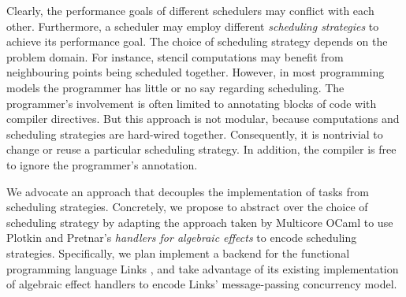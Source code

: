 \documentclass[preprint,10pt,numbers]{sigplanconf}
\begin{document}
Clearly, the performance goals of different schedulers may conflict with each other. Furthermore, a scheduler may employ different \emph{scheduling strategies} to achieve its performance goal. The choice of scheduling strategy depends on the problem domain.
For instance, stencil computations may benefit from neighbouring points being scheduled together.
However, in most programming models the programmer has little or no say regarding scheduling. The programmer's involvement is often limited to annotating blocks of code with compiler directives. But this approach is not modular, because computations and scheduling strategies are hard-wired together. Consequently, it is nontrivial to change or reuse a particular scheduling strategy. In addition, the compiler is free to ignore the programmer's annotation.



We advocate an approach that decouples the implementation of tasks from scheduling strategies.
Concretely, we propose to abstract over the choice of scheduling strategy by adapting the approach taken by Multicore OCaml \cite{Dolan2015} to use Plotkin and Pretnar's \emph{handlers for algebraic effects} \cite{Plotkin2013} to encode scheduling strategies. Specifically, we plan implement a backend for the functional programming language Links \cite{Cooper2006}, and take advantage of its existing implementation of algebraic effect handlers \cite{Hillerstrom2015} to encode Links' message-passing concurrency model.
\end{document}
